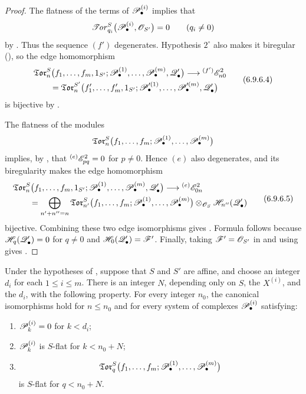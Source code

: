 \begin{proof}
The flatness of the terms of $\mathscr{P}_\bullet^{(i)}$ implies that
\[
  \mathscr{T}\!\mathit{or}_{q_i}^S
  \bigl(
    \mathscr{P}_\bullet^{(i)},\mathscr{O}_{S'}
  \bigr)
  =
  0
  \qquad(q_i\neq0)
\]
by .  Thus the sequence $(f')$ degenerates.
Hypothesis $2^\circ$ also makes it biregular
(), so the edge homomorphism
\[
\begin{split}
  &
  \mathfrak{Tor}_n^S
  \bigl(
    f_1,\ldots,f_m,1_{S'};
    \mathscr{P}_\bullet^{(1)},\ldots,\mathscr{P}_\bullet^{(m)},
    \mathscr{Q}_\bullet'
  \bigr)
  \longrightarrow
  {}^{(f')}\mathscr{E}_{n0}^2
  \\
  &\qquad =
  \mathfrak{Tor}_n^{S'}
  \bigl(
    f_1',\ldots,f_m',1_{S'};
    \mathscr{P}_\bullet^{\prime(1)},\ldots,
    \mathscr{P}_\bullet^{\prime(m)},\mathscr{Q}_\bullet'
  \bigr)
\end{split}
  \tag{6.9.6.4}\label{III.6.9.6.4.eq}
\]
is bijective by .

The flatness of the modules
\[
  \mathfrak{Tor}_n^S
  \bigl(
    f_1,\ldots,f_m;
    \mathscr{P}_\bullet^{(1)},\ldots,\mathscr{P}_\bullet^{(m)}
  \bigr)
\]
implies, by , that
${}^{(e)}\mathscr{E}_{pq}^2=0$ for $p\neq0$.  Hence $(e)$ also
degenerates, and its biregularity makes the edge homomorphism
\[
\begin{split}
  &
  \mathfrak{Tor}_n^S
  \bigl(
    f_1,\ldots,f_m,1_{S'};
    \mathscr{P}_\bullet^{(1)},\ldots,\mathscr{P}_\bullet^{(m)},
    \mathscr{Q}_\bullet'
  \bigr)
  \longrightarrow
  {}^{(e)}\mathscr{E}_{0n}^2
  \\
  &\qquad =
  \bigoplus_{n'+n''=n}
  \mathfrak{Tor}_{n'}^S
  \bigl(
    f_1,\ldots,f_m;
    \mathscr{P}_\bullet^{(1)},\ldots,\mathscr{P}_\bullet^{(m)}
  \bigr)
  \otimes_{\mathscr{O}_S}
  \mathscr{H}_{n''}(\mathscr{Q}_\bullet')
\end{split}
  \tag{6.9.6.5}\label{III.6.9.6.5.eq}
\]
bijective.  Combining these two edge isomorphisms gives
.  Formula  follows because
$\mathscr{H}_q(\mathscr{Q}_\bullet')=0$ for $q\neq0$ and
$\mathscr{H}_0(\mathscr{Q}_\bullet')=\mathscr{F}'$.  Finally, taking
$\mathscr{F}'=\mathscr{O}_{S'}$ in  and using
 gives .
\end{proof}

\begin{corollary}[6.9.7]
\label{III.6.9.7}
Under the hypotheses of , suppose that $S$ and
$S'$ are affine, and choose an integer $d_i$ for each
$1\leq i\leq m$.  There is an integer $N$, depending only on $S$,
the $X^{(i)}$, and the $d_i$, with the following property.  For
every integer $n_0$, the canonical isomorphisms
 hold for $n\leq n_0$ and for every system of
complexes $\mathscr{P}_\bullet^{(i)}$ satisfying:
\begin{enumerate}
  \item[$1^\circ$] $\mathscr{P}_k^{(i)}=0$ for $k<d_i$;
  \item[$2^\circ$] $\mathscr{P}_k^{(i)}$ is $S$-flat for
  $k<n_0+N$;
  \item[$3^\circ$]
  \[
    \mathfrak{Tor}_q^S
    \bigl(
      f_1,\ldots,f_m;
      \mathscr{P}_\bullet^{(1)},\ldots,\mathscr{P}_\bullet^{(m)}
    \bigr)
  \]
  is $S$-flat for $q<n_0+N$.
\end{enumerate}
\end{corollary}

